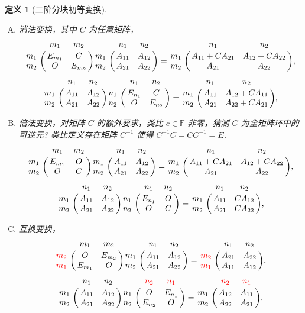 \documentclass[10pt,openany]{article}
\theoremstyle{thmstyle} %
\theoremstyle{defstyle} %
\newtheorem{definition}[theorem]{定义}
\theoremstyle{prostyle} %
\theoremstyle{exastyle}
\theoremstyle{remstyle}
\newcommand{\F}{\mathbb{F}}
\begin{document}
\begin{definition}[二阶分块初等变换]
	\begin{enumerate}[(A)]
		\item 消法变换，其中 \( C \) 为任意矩阵，
		\[ \bordermatrix{
			& m_1 & m_2 \cr
			m_1 & E_{m_1} & C \cr
			m_2 & O & E_{m_2}
		}\bordermatrix{
			& n_1 & n_2 \cr
			m_1 & A_{11} & A_{12} \cr
			m_2 & A_{21} & A_{22}
		}= \bordermatrix{
			& n_1 & n_2 \cr
			m_1 & A_{11}+CA_{21} & A_{12}+CA_{22} \cr
			m_2 & A_{21} & A_{22}
		}, \]
		\[ \bordermatrix{
			& n_1 & n_2 \cr
			m_1 & A_{11} & A_{12} \cr
			m_2 & A_{21} & A_{22}
		}\bordermatrix{
			& n_1 & n_2 \cr
			n_1 & E_{n_1} & C \cr
			n_2 & O & E_{n_2}
		}= \bordermatrix{
			& n_1 & n_2 \cr
			m_1 & A_{11} & A_{12}+CA_{11} \cr
			m_2 & A_{21} & A_{22}+CA_{21}
		}, \]
		
		\item 倍法变换，对矩阵 \( C \) 的额外要求，类比 \( c \in \F \) 非零，猜测 \( C \) 为全矩阵环中的可逆元? 类比定义存在矩阵 \( C^{-1} \) 使得 \( C^{-1}C=CC^{-1}=E\).
		\[ \bordermatrix{
			& m_1 & m_2 \cr
			m_1 & E_{m_1} & O  \cr
			m_2 & O & C
		}\bordermatrix{
			& n_1 & n_2 \cr
			m_1 & A_{11} & A_{12} \cr
			m_2 & A_{21} & A_{22}
		}= \bordermatrix{
			& n_1 & n_2 \cr
			m_1 & A_{11}+CA_{21} & A_{12}+CA_{22} \cr
			m_2 & A_{21} & A_{22}
		}, \]
		\[ \bordermatrix{
			& n_1 & n_2 \cr
			m_1 & A_{11} & A_{12} \cr
			m_2 & A_{21} & A_{22}
		}\bordermatrix{
		& n_1 & n_2 \cr
		n_1 & E_{n_1} & O  \cr
		n_2 & O & C
		}= \bordermatrix{
			& n_1 & n_2 \cr
			m_1 & A_{11} & CA_{12} \cr
			m_2 & A_{21} & CA_{22}
		}, \]
		
		\item 互换变换，
		\[ \bordermatrix{
			& m_1 & m_2 \cr
			{\color{red} m_2} & O & E_{m_2} \cr
			{\color{red} m_1} & E_{m_1} & O
		}\bordermatrix{
			& n_1 & n_2 \cr
			m_1 & A_{11} & A_{12} \cr
			m_2 & A_{21} & A_{22}
		}= \bordermatrix{
			& n_1 & n_2 \cr
			{\color{red} m_2} & A_{21} & A_{22} \cr
			{\color{red} m_1} & A_{11} & A_{12}
		}, \]
		\[ \bordermatrix{
			& n_1 & n_2 \cr
			m_1 & A_{11} & A_{12} \cr
			m_2 & A_{21} & A_{22}
		} \bordermatrix{
		& {\color{red} n_2} & {\color{red} n_1} \cr
		n_1 & O & E_{n_1} \cr
		n_2 & E_{n_2} & O
		}= \bordermatrix{
			& {\color{red} n_2} & {\color{red} n_1} \cr
			m_1 & A_{12} & A_{11} \cr
			m_2 & A_{22} & A_{21}
		}. \]
	\end{enumerate}

\end{definition}
\end{document}
